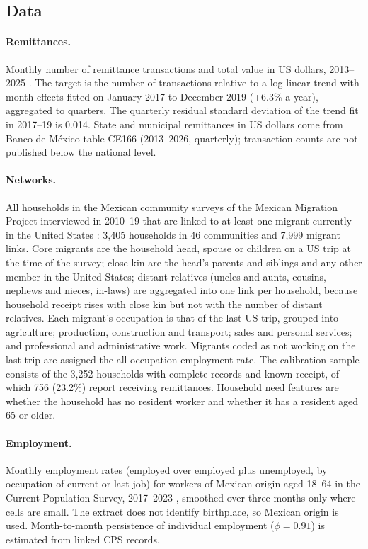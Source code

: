 \documentclass[11pt]{article}
\begin{document}
\subsection{Data}

\paragraph{Remittances.} Monthly number of remittance transactions and total value in US dollars, 2013--2025 \citep{banxico}. The target is the number of transactions relative to a log-linear trend with month effects fitted on January 2017 to December 2019 (+6.3\% a year), aggregated to quarters. The quarterly residual standard deviation of the trend fit in 2017--19 is 0.014. State and municipal remittances in US dollars come from Banco de M\'exico table CE166 (2013--2026, quarterly); transaction counts are not published below the national level.

\paragraph{Networks.} All households in the Mexican community surveys of the Mexican Migration Project interviewed in 2010--19 that are linked to at least one migrant currently in the United States \citep{mmp}: 3,405 households in 46 communities and 7,999 migrant links. Core migrants are the household head, spouse or children on a US trip at the time of the survey; close kin are the head's parents and siblings and any other member in the United States; distant relatives (uncles and aunts, cousins, nephews and nieces, in-laws) are aggregated into one link per household, because household receipt rises with close kin but not with the number of distant relatives. Each migrant's occupation is that of the last US trip, grouped into agriculture; production, construction and transport; sales and personal services; and professional and administrative work. Migrants coded as not working on the last trip are assigned the all-occupation employment rate. The calibration sample consists of the 3,252 households with complete records and known receipt, of which 756 (23.2\%) report receiving remittances. Household need features are whether the household has no resident worker and whether it has a resident aged 65 or older.

\paragraph{Employment.} Monthly employment rates (employed over employed plus unemployed, by occupation of current or last job) for workers of Mexican origin aged 18--64 in the Current Population Survey, 2017--2023 \citep{ipumscps}, smoothed over three months only where cells are small. The extract does not identify birthplace, so Mexican origin is used. Month-to-month persistence of individual employment ($\phi = 0.91$) is estimated from linked CPS records.
\end{document}
